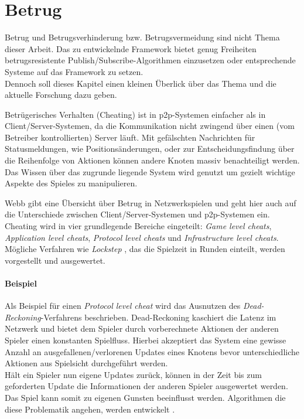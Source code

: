 \section{Betrug}
\label{chap:grundlagen:cheating}
Betrug und Betrugsverhinderung bzw. Betrugsvermeidung sind nicht Thema dieser Arbeit. Das zu entwickelnde Framework bietet genug Freiheiten betrugsresistente Publish/Subscribe-Algorithmen einzusetzen oder entsprechende Systeme auf das Framework zu setzen.\\
Dennoch soll dieses Kapitel einen kleinen Überlick über das Thema und die aktuelle Forschung dazu geben.

Betrügerisches Verhalten (Cheating) ist in p2p-Systemen einfacher als in Client/Server-Systemen, da die Kommunikation nicht zwingend über einen (vom Betreiber kontrollierten) Server läuft. Mit gefälschten Nachrichten für Statusmeldungen, wie Positionsänderungen, oder zur Entscheidungsfindung über die Reihenfolge von Aktionen können andere Knoten massiv benachteiligt werden. Das Wissen über das zugrunde liegende System wird genutzt um gezielt wichtige Aspekte des Spieles zu manipulieren.

Webb \cite{Webb2007Cheating} gibt eine Übersicht über Betrug in Netzwerkspielen und geht hier auch auf die Unterschiede zwischen Client/Server-Systemen und p2p-Systemen ein. Cheating wird in vier grundlegende Bereiche eingeteilt: \emph{Game level cheats}, \emph{Application level cheats}, \emph{Protocol level cheats} und \emph{Infrastructure level cheats}. Mögliche Verfahren wie \emph{Lockstep} \cite{Baughman2007}, das die Spielzeit in Runden einteilt, werden vorgestellt und ausgewertet.

\paragraph{Beispiel}
Als Beispiel für einen \emph{Protocol level cheat} wird das Ausnutzen des \emph{Dead-Reckoning}-Verfahrens \cite{Pantel2002} beschrieben. Dead-Reckoning kaschiert die Latenz im Netzwerk und bietet dem Spieler durch vorberechnete Aktionen der anderen Spieler einen konstanten Spielfluss. Hierbei akzeptiert das System eine gewisse Anzahl an ausgefallenen/verlorenen Updates eines Knotens bevor unterschiedliche Aktionen aus Spielsicht durchgeführt werden.\\
Hält ein Spieler nun eigene Updates zurück, können in der Zeit bis zum geforderten Update die Informationen der anderen Spieler ausgewertet werden. Das Spiel kann somit zu eigenen Gunsten beeinflusst werden. Algorithmen die diese Problematik angehen, werden entwickelt \cite{Aggarwal2005}.

